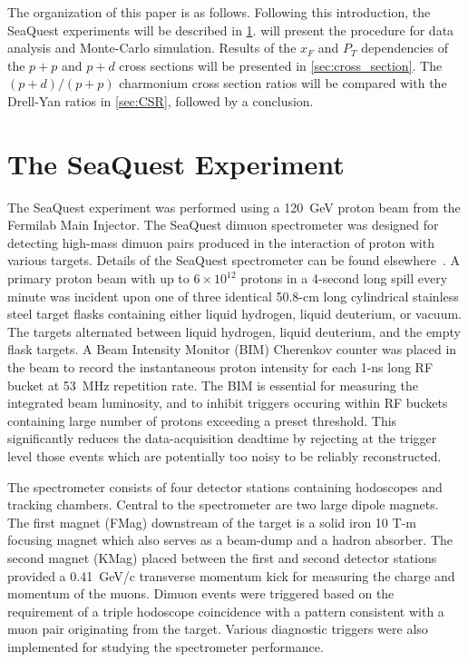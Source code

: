 \documentclass[twocolumn,aps,unsortedaddress,superscriptaddress,prd,floatfix,showpacs,linenumbers]{revtex4-2}
\begin{document}
The organization of this paper is as follows. Following this introduction, the 
SeaQuest experiments will be described in \cref{sec:SeaQuest}. 
will present the procedure for data analysis and Monte-Carlo simulation. Results
of the $x_F$ and $P_T$ dependencies of the $p+p$ and $p+d$ cross sections will
be presented in \cref{sec:cross_section}. The $(p+d)/(p+p)$ charmonium cross section
ratios will be compared with the Drell-Yan ratios in \cref{sec:CSR}, followed by a 
conclusion.

\section{The SeaQuest Experiment}
\label{sec:SeaQuest}
The SeaQuest experiment was performed using a \SI{120}{\GeV} proton beam from the 
Fermilab Main Injector. The SeaQuest dimuon spectrometer was designed for
detecting high-mass dimuon pairs produced in the interaction of proton
with various targets. Details of the SeaQuest spectrometer can be found
elsewhere~\cite{aidala2019}. A primary proton beam with up to $6 \times
10^{12}$ protons in a 4-second long spill every minute was incident upon one
of three identical 50.8-cm long cylindrical stainless steel
target flasks containing either liquid hydrogen, liquid deuterium,
or vacuum. The targets alternated between liquid hydrogen, liquid deuterium,
and the empty flask targets. A Beam Intensity Monitor (BIM) Cherenkov counter 
was placed in the beam to record the instantaneous proton intensity for 
each 1-ns long RF bucket at \SI{53}{\MHz} repetition rate. The BIM is essential
for measuring the integrated beam luminosity, and to inhibit triggers
occuring within RF buckets containing large number of protons 
exceeding a preset threshold. This significantly reduces the data-acquisition
deadtime by rejecting at the trigger level those events which are potentially
too noisy to be reliably reconstructed.  

The spectrometer consists of four detector stations containing
hodoscopes and tracking chambers.
Central to the spectrometer are two large dipole magnets. 
The first magnet (FMag) downstream of the target is a solid iron 10 
T-m focusing magnet which
also serves as a beam-dump and a hadron absorber. The second
magnet (KMag) placed between the first and second detector stations
provided a \SI{0.41}{\GeV/c} transverse momentum kick
for measuring the charge and momentum of the muons. Dimuon events
were triggered based on the requirement of a triple hodoscope
coincidence with a pattern consistent with a muon pair originating
from the target. Various diagnostic triggers were also implemented
for studying the spectrometer performance. 
\end{document}
